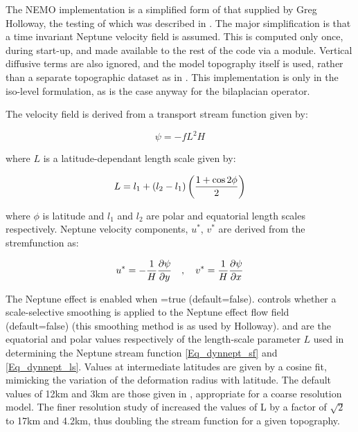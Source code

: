 The NEMO implementation is a simplified form of that supplied by
Greg Holloway, the testing of which was described in \citep{HollowayJGR09}.
The major simplification is that a time invariant Neptune velocity
field is assumed.  This is computed only once, during start-up, and
made available to the rest of the code via a module.  Vertical
diffusive terms are also ignored, and the model topography itself
is used, rather than a separate topographic dataset as in
\citep{HollowayOM08}.  This implementation is only in the iso-level
formulation, as is the case anyway for the bilaplacian operator.

The velocity field is derived from a transport stream function given by:

\begin{equation} \label{Eq_dynnept_sf}
\psi = -fL^2H
\end{equation}

where $L$ is a latitude-dependant length scale given by:

\begin{equation} \label{Eq_dynnept_ls}
L = l_1 + (l_2 -l_1)\left ( {1 + \cos 2\phi \over 2 } \right )
\end{equation}

where $\phi$ is latitude and $l_1$ and $l_2$ are polar and equatorial length scales respectively.
Neptune velocity components, $u^*$, $v^*$ are derived from the stremfunction as:

\begin{equation} \label{Eq_dynnept_vel}
u^* = -{1\over H} {\partial \psi \over \partial y}\ \ \  ,\ \ \ v^* = {1\over H} {\partial \psi \over \partial x}
\end{equation}

\smallskip
\smallskip

The Neptune effect is enabled when =true (default=false).
 controls whether a scale-selective smoothing is applied
to the Neptune effect flow field (default=false) (this smoothing method is as
used by Holloway).   and  are the equatorial and
polar values respectively of the length-scale parameter $L$ used in determining
the Neptune stream function \eqref{Eq_dynnept_sf} and \eqref{Eq_dynnept_ls}.
Values at intermediate latitudes are given by a cosine fit, mimicking the
variation of the deformation radius with latitude.  The default values of 12km
and 3km are those given in \citep{HollowayJPO94}, appropriate for a coarse
resolution model. The finer resolution study of \citep{HollowayOM08} increased
the values of L by a factor of $\sqrt 2$ to 17km and 4.2km, thus doubling the
stream function for a given topography.

